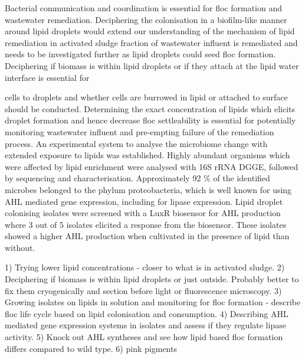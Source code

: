 Bacterial communication and coordination is essential for floc formation and wastewater remediation. Deciphering the colonisation in a biofilm-like manner around lipid droplets would extend our understanding of the mechanism of lipid remediation in activated sludge fraction of wastewater influent is remediated and needs to be investigated further as lipid droplets could seed floc formation. Deciphering if biomass is within lipid droplets or if they attach at the lipid water interface is essential for 

 cells to droplets and whether cells are burrowed in lipid or attached to surface should be conducted. Determining the exact concentration of lipids which elicits droplet formation and hence decrease floc settleability is essential for potentially monitoring wastewater influent and pre-empting failure of the remediation process. An experimental system to analyse the microbiome change with extended exposure to lipids was established. Highly abundant organisms which were affected by lipid enrichment were analysed with 16S rRNA DGGE, followed by sequencing and characterisation. Approximately 92 \% of the identified microbes belonged to the phylum proteobacteria, which is well known for using AHL mediated gene expression, including for lipase expression. Lipid droplet colonising isolates were screened with a LuxR biosensor for AHL production where 3 out of 5 isolates elicited a response from the biosensor. These isolates showed a higher AHL production when cultivated in the presence of lipid than without.


1) Trying lower lipid concentrations - closer to what is in activated sludge.
2) Deciphering if biomass is within lipid droplets or just outside. Probably better to fix them cryogenically and section before light or fluorescence microscopy.
3) Growing isolates on lipids in solution and monitoring for floc formation - describe floc life cycle based on lipid colonisation and consumption.
4) Describing AHL mediated gene expression systems in isolates and assess if they regulate lipase activity.
5) Knock out AHL syntheses and see how lipid based floc formation differs compared to wild type.
6) pink pigments